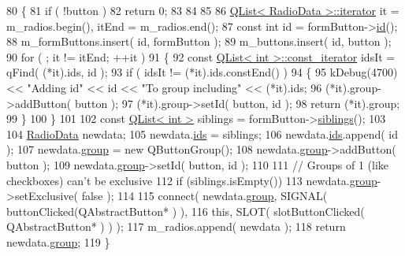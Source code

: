 \begin{DoxyCode}
80 \{
81     \textcolor{keywordflow}{if} ( !button )
82         \textcolor{keywordflow}{return} 0;
83 
84 
85 
86     \hyperlink{classQList}{QList< RadioData >::iterator} it = m\_radios.begin(), itEnd = m\_radios.end();
87     \textcolor{keyword}{const} \textcolor{keywordtype}{int} \textcolor{keywordtype}{id} = formButton->\hyperlink{classOkular_1_1FormField_a88ae3d04b4fbe5fd0fedeb068b3d5071}{id}();
88     m\_formButtons.insert( \textcolor{keywordtype}{id}, formButton );
89     m\_buttons.insert( \textcolor{keywordtype}{id}, button );
90     \textcolor{keywordflow}{for} ( ; it != itEnd; ++it )
91     \{
92         \textcolor{keyword}{const} \hyperlink{classQList}{QList< int >::const\_iterator} idsIt = qFind( (*it).ids, \textcolor{keywordtype}{id} );
93         \textcolor{keywordflow}{if} ( idsIt != (*it).ids.constEnd() )
94         \{
95             kDebug(4700) << \textcolor{stringliteral}{"Adding id"} << \textcolor{keywordtype}{id} << \textcolor{stringliteral}{"To group including"} << (*it).ids;
96             (*it).group->addButton( button );
97             (*it).group->setId( button, \textcolor{keywordtype}{id} );
98             \textcolor{keywordflow}{return} (*it).group;
99         \}
100     \}
101 
102     \textcolor{keyword}{const} \hyperlink{classQList}{QList< int >} siblings = formButton->\hyperlink{classOkular_1_1FormFieldButton_a952fa128da5499ce3884c7774bed215b}{siblings}();
103 
104     \hyperlink{structRadioData}{RadioData} newdata;
105     newdata.\hyperlink{structRadioData_a21f69679e22a608dcd636c0daddd7326}{ids} = siblings;
106     newdata.\hyperlink{structRadioData_a21f69679e22a608dcd636c0daddd7326}{ids}.append( \textcolor{keywordtype}{id} );
107     newdata.\hyperlink{structRadioData_a1c709c31b16adf9860dcec8c45768218}{group} = \textcolor{keyword}{new} QButtonGroup();
108     newdata.\hyperlink{structRadioData_a1c709c31b16adf9860dcec8c45768218}{group}->addButton( button );
109     newdata.\hyperlink{structRadioData_a1c709c31b16adf9860dcec8c45768218}{group}->setId( button, \textcolor{keywordtype}{id} );
110 
111     \textcolor{comment}{// Groups of 1 (like checkboxes) can't be exclusive}
112     \textcolor{keywordflow}{if} (siblings.isEmpty())
113         newdata.\hyperlink{structRadioData_a1c709c31b16adf9860dcec8c45768218}{group}->setExclusive( \textcolor{keyword}{false} );
114 
115     connect( newdata.\hyperlink{structRadioData_a1c709c31b16adf9860dcec8c45768218}{group}, SIGNAL( buttonClicked(QAbstractButton* ) ),
116              \textcolor{keyword}{this}, SLOT( slotButtonClicked( QAbstractButton* ) ) );
117     m\_radios.append( newdata );
118     \textcolor{keywordflow}{return} newdata.\hyperlink{structRadioData_a1c709c31b16adf9860dcec8c45768218}{group};
119 \}
\end{DoxyCode}

